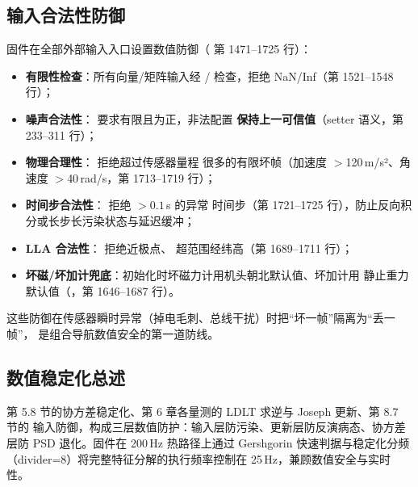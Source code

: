 \subsection{输入合法性防御}

固件在全部外部输入入口设置数值防御（ 第 1471--1725 行）：
\begin{itemize}
  \item \textbf{有限性检查}：所有向量/矩阵输入经  /
     检查，拒绝 NaN/Inf（第 1521--1548 行）；
  \item \textbf{噪声合法性}： 要求有限且为正，非法配置
    \textbf{保持上一可信值}（setter 语义，第 233--311 行）；
  \item \textbf{物理合理性}： 拒绝超过传感器量程
    很多的有限坏帧（加速度 $>$120\,m/s²、角速度 $>$40\,rad/s，第 1713--1719 行）；
  \item \textbf{时间步合法性}： 拒绝 $>0.1$\,s 的异常
    时间步（第 1721--1725 行），防止反向积分或长步长污染状态与延迟缓冲；
  \item \textbf{LLA 合法性}： 拒绝近极点、
    超范围经纬高（第 1689--1711 行）；
  \item \textbf{坏磁/坏加计兜底}：初始化时坏磁力计用机头朝北默认值、坏加计用
    静止重力默认值（，第 1646--1687 行）。
\end{itemize}
这些防御在传感器瞬时异常（掉电毛刺、总线干扰）时把``坏一帧''隔离为``丢一帧''，
是组合导航数值安全的第一道防线。

\subsection{数值稳定化总述}

第 5.8 节的协方差稳定化、第 6 章各量测的 LDLT 求逆与 Joseph 更新、第 8.7 节的
输入防御，构成三层数值防护：输入层防污染、更新层防反演病态、协方差层防 PSD
退化。固件在 200\,Hz 热路径上通过 Gershgorin 快速判据与稳定化分频
（divider=8）将完整特征分解的执行频率控制在 25\,Hz，兼顾数值安全与实时性。
